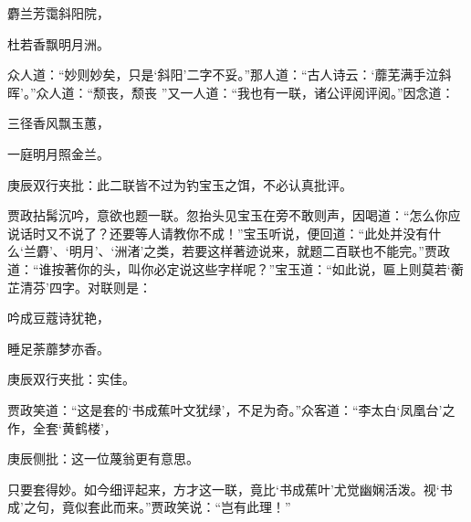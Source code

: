 \begin{poem}
    \begin{pl}    麝兰芳霭斜阳院，\end{pl}

    \begin{pl}    杜若香飘明月洲。\end{pl}
\end{poem}


\begin{parag}
    众人道：“妙则妙矣，只是‘斜阳’二字不妥。”那人道：“古人诗云：‘蘼芜满手泣斜晖’。”众人道：“颓丧，颓丧 ”又一人道：“我也有一联，诸公评阅评阅。”因念道：
\end{parag}
\begin{poem}
    \begin{pl}三径香风飘玉蕙，\end{pl}

    \begin{pl}一庭明月照金兰。\end{pl}
    \begin{note}庚辰双行夹批：此二联皆不过为钓宝玉之饵，不必认真批评。\end{note}
\end{poem}


\begin{parag}
    贾政拈髯沉吟，意欲也题一联。忽抬头见宝玉在旁不敢则声，因喝道：“怎么你应说话时又不说了？还要等人请教你不成！”宝玉听说，便回道：“此处并没有什么‘兰麝’、‘明月’、‘洲渚’之类，若要这样著迹说来，就题二百联也不能完。”贾政道：“谁按著你的头，叫你必定说这些字样呢？”宝玉道：“如此说，匾上则莫若‘蘅芷清芬’四字。对联则是：
\end{parag}
\begin{poem}
    \begin{pl}吟成豆蔻诗犹艳，\end{pl}
    \begin{pl}睡足荼蘼梦亦香。\end{pl}\begin{note}庚辰双行夹批：实佳。\end{note}
\end{poem}

\begin{parag}
    贾政笑道：“这是套的‘书成蕉叶文犹绿’，不足为奇。”众客道：“李太白‘凤凰台’之作，全套‘黄鹤楼’，\begin{note}庚辰侧批：这一位蔑翁更有意思。\end{note}只要套得妙。如今细评起来，方才这一联，竟比‘书成蕉叶’尤觉幽娴活泼。视‘书成’之句，竟似套此而来。”贾政笑说：“岂有此理！”
\end{parag}


